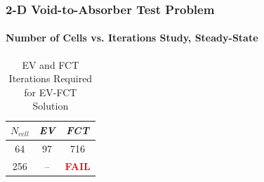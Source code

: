\begin{frame}
\frametitle{2-D Void-to-Absorber Test Problem}
\framesubtitle{Number of Cells vs. Iterations Study, Steady-State}

\begin{center}
\begin{table}[h]
\caption{EV and FCT Iterations Required for EV-FCT Solution}
\begin{tabular}{c c c}\toprule
$N_{cell}$ & \emph{EV} & \emph{FCT}\\\midrule
 64 & 97 & 716\\
256 & -- & \textcolor{red}{\textbf{FAIL}}\\
\bottomrule\end{tabular}
\end{table}
\end{center}

\end{frame}
